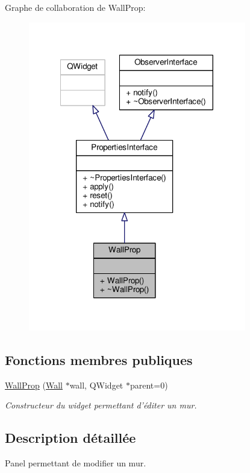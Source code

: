 Graphe de collaboration de Wall\+Prop\+:
\nopagebreak
\begin{figure}[H]
\begin{center}
\leavevmode
\includegraphics[width=269pt]{da/dd5/classWallProp__coll__graph}
\end{center}
\end{figure}
\subsection*{Fonctions membres publiques}
\begin{DoxyCompactItemize}
\item 
\hyperlink{classWallProp_adb6bbb2ab2fbbb9a8e15a3f38b421595}{Wall\+Prop} (\hyperlink{classWall}{Wall} $\ast$wall, Q\+Widget $\ast$parent=0)
\begin{DoxyCompactList}\small\item\em Constructeur du widget permettant d’éditer un mur. \end{DoxyCompactList}\end{DoxyCompactItemize}


\subsection{Description détaillée}
Panel permettant de modifier un mur. 

